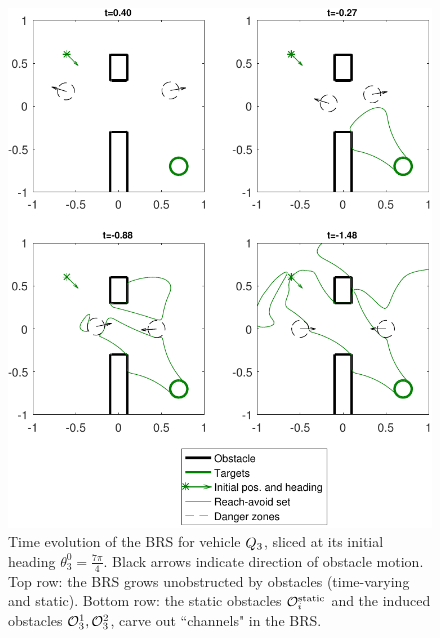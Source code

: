 \begin{figure}
	\centering
	\includegraphics[width=\columnwidth]{fig/dubins_reach_3}
	\caption{Time evolution of the BRS for vehicle $Q_3$, sliced at its initial heading $\theta_3^0=\frac{7\pi}{4}$. Black arrows indicate direction of obstacle motion. Top row: the BRS grows unobstructed by obstacles (time-varying and static). Bottom row: the static obstacles $\mathcal{O}^\text{static}_i$ and the induced obstacles $\mathcal{O}_3^1,\mathcal{O}_3^2$, carve out ``channels" in the BRS.}
	\label{fig:dubins_reach_3}
\end{figure}

